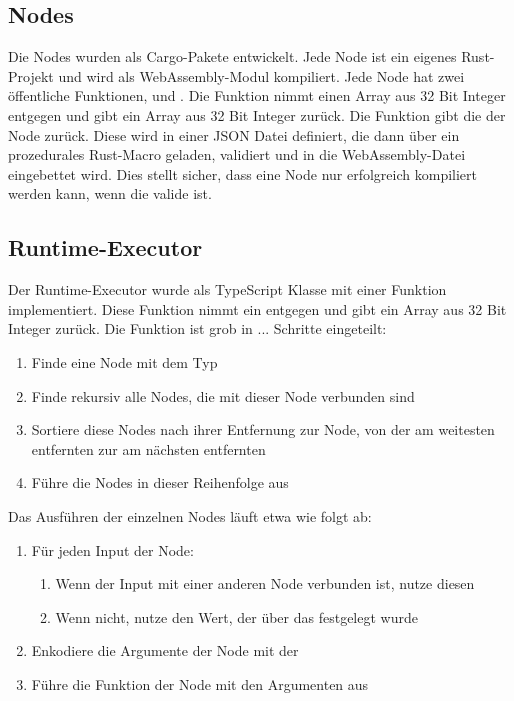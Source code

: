 \documentclass[ngerman]{article}
\begin{document}
\subsection{Nodes}
Die Nodes wurden als Cargo-Pakete entwickelt. Jede Node ist ein eigenes Rust-Projekt und wird als WebAssembly-Modul kompiliert.
\br
Jede Node hat zwei öffentliche Funktionen,  und . Die  Funktion nimmt einen Array aus 32 Bit Integer entgegen und gibt ein Array aus 32 Bit Integer zurück. 
\br
Die  Funktion gibt die  der Node zurück. 
Diese  wird in einer JSON Datei definiert, die dann über ein prozedurales Rust-Macro geladen, validiert und in die WebAssembly-Datei eingebettet wird. Dies stellt sicher, dass eine Node nur erfolgreich kompiliert werden kann, wenn die  valide ist.

\subsection{Runtime-Executor}
Der Runtime-Executor wurde als TypeScript Klasse mit einer  Funktion implementiert. Diese  Funktion nimmt ein  entgegen und gibt ein Array aus 32 Bit Integer zurück. Die Funktion ist grob in ... Schritte eingeteilt:

\begin{enumerate}
  \item Finde eine Node mit dem Typ 
  \item Finde rekursiv alle Nodes, die mit dieser Node verbunden sind
  \item Sortiere diese Nodes nach ihrer Entfernung zur  Node, von der am weitesten entfernten zur am nächsten entfernten
  \item Führe die Nodes in dieser Reihenfolge aus
\end{enumerate}

Das Ausführen der einzelnen Nodes läuft etwa wie folgt ab:

\begin{enumerate}
  \item Für jeden Input der Node:
  \begin{enumerate}
      \item Wenn der Input mit einer anderen Node verbunden ist, nutze diesen
      \item Wenn nicht, nutze den Wert, der über das  festgelegt wurde
  \end{enumerate}
  \item Enkodiere die Argumente der Node mit der 
  \item Führe die  Funktion der Node mit den Argumenten aus
\end{enumerate}
\end{document}
